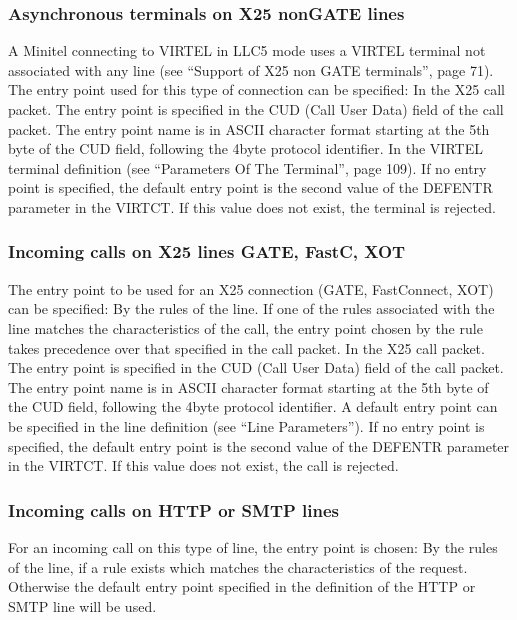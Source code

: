 \documentclass[letterpaper,10pt,english]{sphinxmanual}
\begin{document}
\subsubsection{Asynchronous terminals on X25 non\sphinxhyphen{}GATE lines}
\label{\detokenize{connectivity_guide:asynchronous-terminals-on-x25-non-gate-lines}}
\sphinxAtStartPar
A Minitel connecting to VIRTEL in LLC5 mode uses a VIRTEL terminal not associated with any line (see “Support of X25 non GATE terminals”, page 71). The entry point used for this type of connection can be specified:
\sphinxhyphen{} In the X25 call packet. The entry point is specified in the CUD (Call User Data) field of the call packet. The entry point name is in ASCII character format starting at the 5th byte of the CUD field, following the 4\sphinxhyphen{}byte protocol identifier.
\sphinxhyphen{} In the VIRTEL terminal definition (see “Parameters Of The Terminal”, page 109).
\sphinxhyphen{} If no entry point is specified, the default entry point is the second value of the DEFENTR parameter in the VIRTCT. If this value does not exist, the terminal is rejected.


\subsubsection{Incoming calls on X25 lines \sphinxhyphen{} GATE, FastC, XOT}
\label{\detokenize{connectivity_guide:incoming-calls-on-x25-lines-gate-fastc-xot}}
\sphinxAtStartPar
The entry point to be used for an X25 connection (GATE, FastConnect, XOT) can be specified:
\sphinxhyphen{} By the rules of the line. If one of the rules associated with the line matches the characteristics of the call, the entry point chosen by the rule takes precedence over that specified in the call packet.
\sphinxhyphen{} In the X25 call packet. The entry point is specified in the CUD (Call User Data) field of the call packet. The entry point name is in ASCII character format starting at the 5th byte of the CUD field, following the 4\sphinxhyphen{}byte protocol identifier.
\sphinxhyphen{} A default entry point can be specified in the line definition (see “Line Parameters”).
\sphinxhyphen{} If no entry point is specified, the default entry point is the second value of the DEFENTR parameter in the VIRTCT. If this value does not exist, the call is rejected.


\subsubsection{Incoming calls on HTTP or SMTP lines}
\label{\detokenize{connectivity_guide:incoming-calls-on-http-or-smtp-lines}}
\sphinxAtStartPar
For an incoming call on this type of line, the entry point is chosen:
\sphinxhyphen{} By the rules of the line, if a rule exists which matches the characteristics of the request.
\sphinxhyphen{} Otherwise the default entry point specified in the definition of the HTTP or SMTP line will be used.
\end{document}
